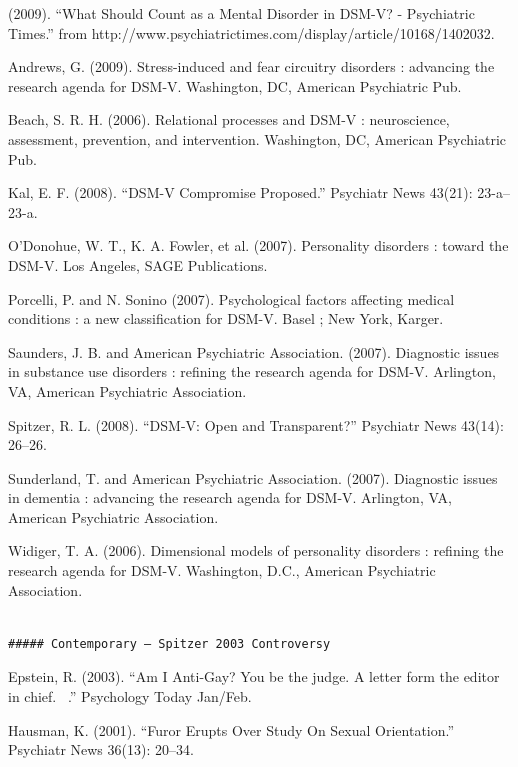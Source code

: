 (2009). ``What Should Count as a Mental Disorder in DSM-V? - Psychiatric Times.'' from http:\slash \slash www.psychiatrictimes.com\slash display\slash article\slash 10168\slash 1402032.

Andrews, G. (2009). Stress-induced and fear circuitry disorders : advancing the research agenda for DSM-V. Washington, DC, American Psychiatric Pub.

Beach, S. R. H. (2006). Relational processes and DSM-V : neuroscience, assessment, prevention, and intervention. Washington, DC, American Psychiatric Pub.

Kal, E. F. (2008). ``DSM-V Compromise Proposed.'' Psychiatr News 43(21): 23-a--23-a.

O'Donohue, W. T., K. A. Fowler, et al. (2007). Personality disorders : toward the DSM-V. Los Angeles, SAGE Publications.

Porcelli, P. and N. Sonino (2007). Psychological factors affecting medical conditions : a new classification for DSM-V. Basel ; New York, Karger.

Saunders, J. B. and American Psychiatric Association. (2007). Diagnostic issues in substance use disorders : refining the research agenda for DSM-V. Arlington, VA, American Psychiatric Association.

Spitzer, R. L. (2008). ``DSM-V: Open and Transparent?'' Psychiatr News 43(14): 26--26.

Sunderland, T. and American Psychiatric Association. (2007). Diagnostic issues in dementia : advancing the research agenda for DSM-V. Arlington, VA, American Psychiatric Association.

Widiger, T. A. (2006). Dimensional models of personality disorders : refining the research agenda for DSM-V. Washington, D.C., American Psychiatric Association.

\begin{adjustwidth}{2.5em}{2.5em}
\begin{verbatim}

##### Contemporary – Spitzer 2003 Controversy

\end{verbatim}
\end{adjustwidth}

Epstein, R. (2003). ``Am I Anti-Gay? You be the judge. A letter form the editor in chief.  .'' Psychology Today Jan\slash Feb.

Hausman, K. (2001). ``Furor Erupts Over Study On Sexual Orientation.'' Psychiatr News 36(13): 20--34.

